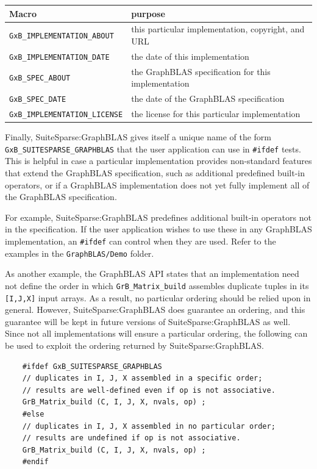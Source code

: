 \vspace{0.2in}
{\footnotesize
\begin{tabular}{ll}
\hline
Macro                & purpose                                      \\
\hline
\verb'GxB_IMPLEMENTATION_ABOUT'
    & this particular implementation, copyright, and URL \\
\verb'GxB_IMPLEMENTATION_DATE'
    & the date of this implementation \\
\verb'GxB_SPEC_ABOUT'
    & the GraphBLAS specification for this implementation \\
\verb'GxB_SPEC_DATE'
    & the date of the GraphBLAS specification \\
\verb'GxB_IMPLEMENTATION_LICENSE'
    & the license for this particular implementation \\
\hline
\end{tabular}
}
\vspace{0.2in}

Finally, SuiteSparse:GraphBLAS gives itself a unique name of the form
\verb'GxB_SUITESPARSE_GRAPHBLAS' that the user application can use in
\verb'#ifdef' tests. This is helpful in case a particular implementation
provides non-standard features that extend the GraphBLAS specification, such as
additional predefined built-in operators, or if a GraphBLAS implementation does
not yet fully implement all of the GraphBLAS specification.

For example, SuiteSparse:GraphBLAS predefines additional built-in operators not
in the specification.  If the user application wishes to use these in any
GraphBLAS implementation, an \verb'#ifdef' can control when they are used.
Refer to the examples in the \verb'GraphBLAS/Demo' folder.

As another example, the GraphBLAS API states that an implementation need not
define the order in which \verb'GrB_Matrix_build' assembles duplicate tuples in
its \verb'[I,J,X]' input arrays.  As a result, no particular ordering should be
relied upon in general.  However, SuiteSparse:GraphBLAS does guarantee an
ordering, and this guarantee will be kept in future versions of
SuiteSparse:GraphBLAS as well.  Since not all implementations will ensure a
particular ordering, the following can be used to exploit the ordering returned
by SuiteSparse:GraphBLAS.

    {\footnotesize
    \begin{verbatim}
    #ifdef GxB_SUITESPARSE_GRAPHBLAS
    // duplicates in I, J, X assembled in a specific order;
    // results are well-defined even if op is not associative.
    GrB_Matrix_build (C, I, J, X, nvals, op) ;
    #else
    // duplicates in I, J, X assembled in no particular order;
    // results are undefined if op is not associative.
    GrB_Matrix_build (C, I, J, X, nvals, op) ;
    #endif \end{verbatim}}


